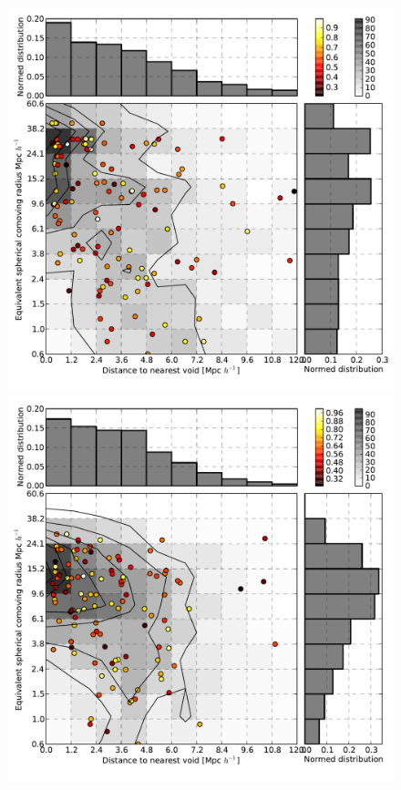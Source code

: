 \documentclass[a4,useAMS,usenatbib,usegraphicx]{latex/mn2e}
\begin{document}
\begin{flushleft}
\begin{figure}
\begin{center}
  \includegraphics[trim = 0mm 9mm 1mm 0mm, clip, keepaspectratio=true,
  width=0.36\textheight]{./figures/voids_statistics_samples_BDM_Tweb}
  \includegraphics[trim = 0mm 9mm 1mm 0mm, clip, keepaspectratio=true,
  width=0.36\textheight]{./figures/voids_statistics_samples_BDM_Vweb}
        

\end{center}
\end{figure}
\end{flushleft}
\end{document}
